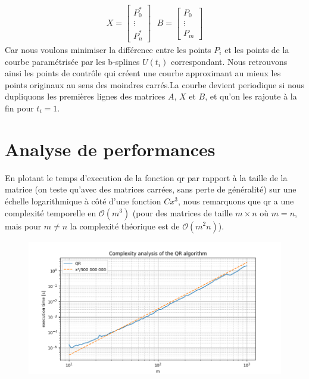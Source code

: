 \documentclass[11pt]{article}
\begin{document}
\begin{enumerate}
\begin{gather}
        X = \left[\begin{array}{c}
            P^*_0 \\ \vdots \\ P^*_n
        \end{array}\right]~~~
        B = \left[\begin{array}{c}
            P_0 \\ \vdots \\ P_m
        \end{array}\right]
    \end{gather}
    Car nous voulons minimiser la différence entre les points $P_i$ et les points de la courbe paramétrisée par les b-splines $U(t_i)$ correspondant. Nous retrouvons ainsi les points de contrôle qui créent une courbe approximant au mieux les points originaux au sens des moindres carrés.La courbe devient periodique si nous dupliquons les premières lignes des matrices $A$, $X$ et $B$, et qu'on les rajoute à la fin pour $t_i = 1$.
\end{enumerate}

\section{Analyse de performances}

En plotant le temps d'execution de la fonction qr par rapport à la taille de la matrice (on teste qu'avec des matrices carrées, sans perte de généralité) sur une échelle logarithmique à côté d'une fonction $Cx^3$, nous remarquons que qr a une complexité temporelle en $\mathcal{O}(m^3)$ (pour des matrices de taille $m \times n$ où $m = n$, mais pour $m \neq n$ la complexité théorique est de $\mathcal{O}(m^2n)$).

\begin{figure}[h]
    \centering
    \includegraphics[scale=0.6]{images/perf.png}
\end{figure}
\end{document}
